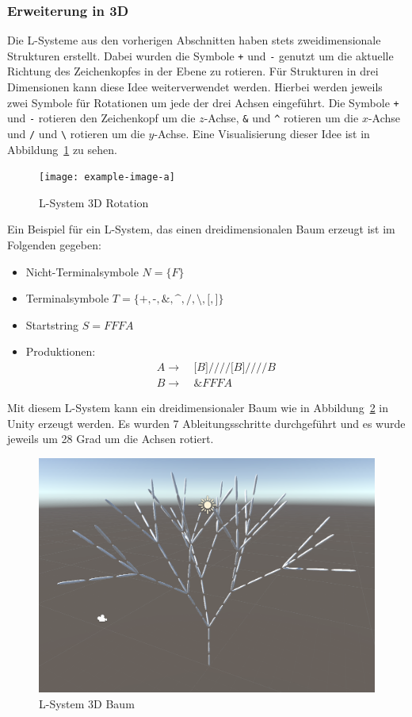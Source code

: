 \subsubsection{Erweiterung in 3D}
Die L-Systeme aus den vorherigen Abschnitten haben stets zweidimensionale Strukturen erstellt.
Dabei wurden die Symbole \texttt{+} und \texttt{-} genutzt um die aktuelle Richtung des Zeichenkopfes in der Ebene zu rotieren.
Für Strukturen in drei Dimensionen kann diese Idee weiterverwendet werden.
Hierbei werden jeweils zwei Symbole für Rotationen um jede der drei Achsen eingeführt.
Die Symbole \texttt{+} und \texttt{-} rotieren den Zeichenkopf um die $z$-Achse, \texttt{\&} und \texttt{\textasciicircum} rotieren um die $x$-Achse und \texttt{/} und \texttt{\textbackslash} rotieren um die $y$-Achse.
Eine Visualisierung dieser Idee ist in Abbildung~\ref{fig:L-System 3D Rotation} zu sehen.
\begin{figure}[ht]
    \centering
        
    \texttt{[image: example-image-a]}
    \caption{L-System 3D Rotation}\label{fig:L-System 3D Rotation}
\end{figure}

Ein Beispiel für ein L-System, das einen dreidimensionalen Baum erzeugt ist im Folgenden gegeben:
\begin{itemize}
    \item Nicht-Terminalsymbole $N=\{F\}$
    \item Terminalsymbole $T=\{\texttt{+},\texttt{-},\texttt{\&},\texttt{\textasciicircum},\texttt{/},\texttt{\textbackslash},\texttt{[},\texttt{]}\}$
    \item Startstring $S=FFFA$
    \item Produktionen:
    \begin{align*}
        A\rightarrow &~\texttt{[}B\texttt{]////[}B\texttt{]////}B \\
        B\rightarrow &~\texttt{\&}FFFA
    \end{align*}
\end{itemize}

Mit diesem L-System kann ein dreidimensionaler Baum wie in Abbildung~\ref{fig:L-System 3D Unity} in Unity erzeugt werden.
Es wurden 7 Ableitungsschritte durchgeführt und es wurde jeweils um 28 Grad um die Achsen rotiert.

\begin{figure}[ht]
    \centering
        
    \includegraphics[width=0.5\linewidth]{chapters/02_Grundlagen/L_System/L_System_3D_Tree.png}
    \caption{L-System 3D Baum}\label{fig:L-System 3D Unity}
\end{figure}


